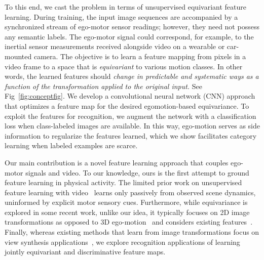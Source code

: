 \documentclass[10pt,twocolumn,letterpaper]{article}
\newcommand{\cc}{}
\begin{document}

To this end, we cast the problem in terms of unsupervised equivariant feature learning.  During training, the input image sequences are accompanied by a synchronized stream of ego-motor sensor readings; \cc{however, they need not possess any semantic labels.}  The ego-motor signal could correspond, for example, to the inertial sensor measurements received alongside video on a wearable or car-mounted camera.  The objective is to learn a feature mapping from pixels in a video frame to a space that is \emph{equivariant} to various motion classes.  In other words, the learned features should \emph{change in predictable and systematic ways as a function of the transformation applied to the original input.}  See Fig~\ref{fig:conceptfig}.  We develop a convolutional neural network (CNN) approach that optimizes a feature map for the desired egomotion-based equivariance.  To exploit the features for recognition, we augment the network with a classification loss when class-labeled images are available. In this way, ego-motion serves as side information to regularize the features learned, which we show facilitates category learning when labeled examples are scarce.


Our main contribution is a novel feature learning approach that couples ego-motor signals and video.  To our knowledge, ours is the first attempt to ground feature learning in physical activity.
%
The limited prior work on unsupervised feature learning with video~\cite{Mobahi2009,Ranzato2014, Michalski2014,Goroshin2014} learns only passively from observed scene dynamics, uninformed by explicit motor sensory cues.  Furthermore, while equivariance is explored in some recent work, unlike our idea, it typically focuses on 2D image transformations as opposed to 3D ego-motion~\cite{kivinen2011transformation,schmidt2012learning} and considers existing features~\cite{tinne-survey,Vedaldi2014}.  Finally, whereas existing methods that learn from image transformations focus on view synthesis applications~\cite{Hinton2011,kulkarni2015deep,Michalski2014}, we explore recognition applications of learning jointly equivariant and discriminative feature maps.
\end{document}
